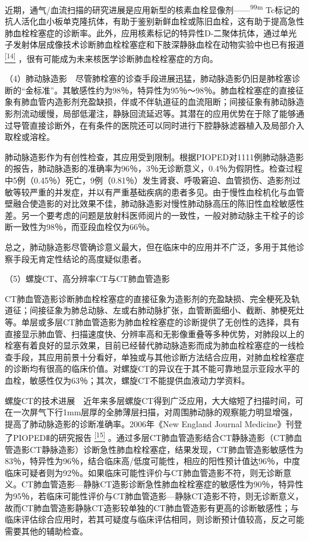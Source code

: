 近期，通气/血流扫描的研究进展是应用新型的核素血栓显像剂------\textsuperscript{99m}
Tc标记的抗人活化血小板单克隆抗体，有助于鉴别新鲜血栓或陈旧血栓，这有助于提高急性肺血栓栓塞症的诊断率。此外，应用核素标记的特异性D-二聚体抗体，通过单光子发射体层成像技术诊断肺血栓栓塞症和下肢深静脉血栓在动物实验中也已有报道
\protect\hyperlink{text00022.htmlux5cux23ch14-21}{\textsuperscript{{[}14{]}}}
，很有可能成为未来核医学诊断肺血栓栓塞症的方向。

（4）肺动脉造影　尽管肺栓塞的诊查手段进展迅猛，肺动脉造影仍旧是肺栓塞诊断的“金标准”。其敏感性约为98％，特异性为95％～98％。肺血栓栓塞症的直接征象有肺血管内造影剂充盈缺损，伴或不伴轨道征的血流阻断；间接征象有肺动脉造影剂流动缓慢，局部低灌注，静脉回流延迟等。其潜在的应用优势在于除了能够通过导管直接诊断外，在有条件的医院还可以同时进行下腔静脉滤器植入及局部介入取栓或溶栓。

肺动脉造影作为有创性检查，其应用受到限制。根据PIOPED对1111例肺动脉造影的报告，肺动脉造影的准确率为96％，3％无诊断意义，0.4％为假阴性。检查过程中5例（0.45％）死亡，9例（0.81％）发生肾衰、呼吸窘迫、血管损伤、造影剂过敏等较严重的并发症，并以有严重基础疾病的患者多见。由于慢性血栓机化与血管壁融合使造影的对比效果不佳，肺动脉造影对慢性肺动脉高压的陈旧性血栓敏感性差。另一个要考虑的问题是放射科医师阅片的一致性，一般对肺动脉主干栓子的诊断一致性为98％，而亚段血栓仅为66％。

总之，肺动脉造影尽管确诊意义最大，但在临床中的应用并不广泛，多用于其他诊察手段无肯定性结论的高度疑似患者。

（5）螺旋CT、高分辨率CT与CT肺血管造影

CT肺血管造影诊断肺血栓栓塞症的直接征象为造影剂的充盈缺损、完全梗死及轨道征；间接征象为肺总动脉、左或右肺动脉扩张，血管断面细小、截断、肺梗死灶等。单层或多层CT肺血管造影为肺血栓栓塞症的诊断提供了无创性的选择，具有直接显示肺血管、扫描速度快、分辨率高和无影像重叠等多种优势，对肺段以上的栓塞有着良好的显示效果，目前已经替代肺动脉造影而成为肺血栓栓塞症的一线检查手段，其应用前景十分看好，单独或与其他诊断方法结合应用，对肺血栓栓塞症的诊断均有很高的临床价值。对螺旋CT的异议在于其不能可靠地显示亚段水平的血栓，敏感性仅为63％；其次，螺旋CT不能提供血液动力学资料。

螺旋CT的技术进展　近年来多层螺旋CT得到广泛应用，大大缩短了扫描时间，可在一次屏气下行1mm层厚的全肺薄层扫描，对周围肺动脉的观察能力明显增强，提高了肺动脉造影的诊断准确率。2006年《New
England Journal Medicine》刊登了PIOPEDⅡ的研究报告
\protect\hyperlink{text00022.htmlux5cux23ch15-21}{\textsuperscript{{[}15{]}}}
。通过多层CT肺血管造影结合CT静脉造影（CT肺血管造影CT静脉造影）诊断急性肺血栓栓塞症，结果发现，CT肺血管造影敏感性为83％，特异性为96％，结合临床高/低度可能性，相应的阳性预计值达96％，中度临床可疑者则为92％。如果临床可能性评价与CT肺血管造影不符，则无诊断意义。CT肺血管造影---静脉CT造影诊断急性肺血栓栓塞症的敏感性为90％，特异性为95％，若临床可能性评价与CT肺血管造影---静脉CT造影不符，则无诊断意义，故而CT肺血管造影静脉CT造影较单独的CT肺血管造影有更高的诊断敏感性；与临床评估综合应用时，若其可疑度与临床评估相同，则诊断预计值较高，反之可能需要其他的辅助检查。

